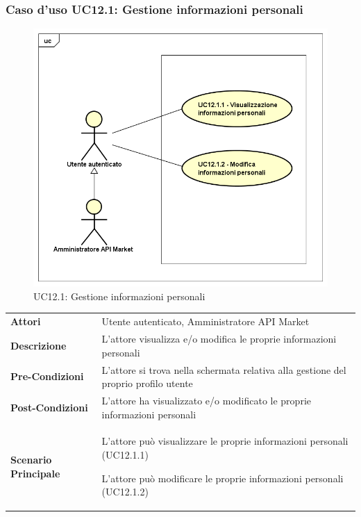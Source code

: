 \newpage
\subsubsection{Caso d'uso UC12.1: Gestione informazioni personali}
\label{UC12_1}
\begin{figure}[ht]
	\centering
	\includegraphics[scale=0.45]{UML/UC12_1.png}
	\caption{UC12.1: Gestione informazioni personali}
\end{figure}

\begin{minipage}{\linewidth}
	\begin{tabular}{ l | p{11cm}}
		\hline
		\rowcolor{Gray}
		\multicolumn{2}{c}{UC12.1 - Gestione informazioni personali} \\
		\hline
		\textbf{Attori} & Utente autenticato, Amministratore API Market \\
		\textbf{Descrizione} & L'attore visualizza e/o modifica le proprie informazioni personali \\
		\textbf{Pre-Condizioni} & L'attore si trova nella schermata relativa alla gestione del proprio profilo utente \\
		\textbf{Post-Condizioni} & L'attore ha visualizzato e/o modificato le proprie informazioni personali \\
		\textbf{Scenario Principale} & 
		\begin{enumerate*}[label=(\arabic*.),itemjoin={\newline}]
			\item L'attore può visualizzare le proprie informazioni personali (UC12.1.1)
			\item L'attore può modificare le proprie informazioni personali (UC12.1.2)
		\end{enumerate*}
	\end{tabular}
\end{minipage}

